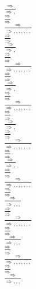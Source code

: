 \documentclass[11pt]{article}
\begin{document}
\begin{center}
\bigskip
\\$\frac{\Rightarrow }{\Rightarrow , }$
\bigskip
\\$\frac{\Rightarrow }{\Rightarrow }$
\bigskip
\\$\frac{\Rightarrow }{\Rightarrow , , , , , , , }$
\bigskip
\\$\frac{\Rightarrow }{\Rightarrow }$
\bigskip
\\$\frac{\Rightarrow }{\Rightarrow , }$
\bigskip
\\$\frac{\Rightarrow }{\Rightarrow }$
\bigskip
\\$\frac{\Rightarrow }{\Rightarrow , , , , , , , }$
\bigskip
\\$\frac{\Rightarrow }{\Rightarrow }$
\bigskip
\\$\frac{\Rightarrow }{\Rightarrow , }$
\bigskip
\\$\frac{\Rightarrow }{\Rightarrow }$
\bigskip
\\$\frac{\Rightarrow }{\Rightarrow , , , , , , , }$
\bigskip
\\$\frac{\Rightarrow }{\Rightarrow }$
\bigskip
\\$\frac{\Rightarrow }{\Rightarrow , }$
\bigskip
\\$\frac{\Rightarrow }{\Rightarrow }$
\bigskip
\\$\frac{\Rightarrow }{\Rightarrow , , , , , , , }$
\bigskip
\\$\frac{\Rightarrow }{\Rightarrow }$
\bigskip
\\$\frac{\Rightarrow }{\Rightarrow , }$
\bigskip
\\$\frac{\Rightarrow }{\Rightarrow }$
\bigskip
\\$\frac{\Rightarrow }{\Rightarrow , , , , , , , }$
\bigskip
\\$\frac{\Rightarrow }{\Rightarrow }$
\bigskip
\\$\frac{\Rightarrow }{\Rightarrow , , , }$
\bigskip
\\$\frac{\Rightarrow }{\Rightarrow }$
\bigskip
\\$\frac{\Rightarrow }{\Rightarrow , , , , , , , }$
\bigskip
\\$\frac{\Rightarrow }{\Rightarrow }$
\bigskip
\\$\frac{\Rightarrow }{\Rightarrow , , , }$
\bigskip
\\$\frac{\Rightarrow }{\Rightarrow }$
\bigskip
\\$\frac{\Rightarrow }{\Rightarrow , , , , , , , }$
\bigskip
\\$\frac{\Rightarrow }{\Rightarrow }$
\bigskip
\\$\frac{\Rightarrow }{\Rightarrow , , , }$

\end{center}
\end{document}

